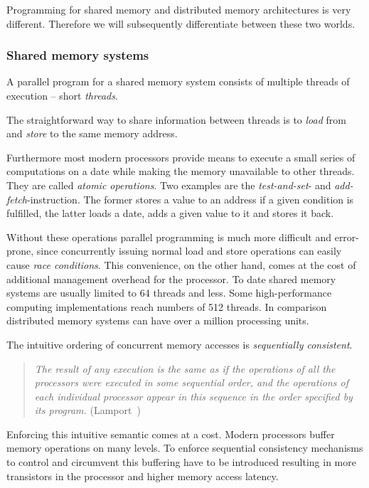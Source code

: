 \documentclass[a4paper, 10pt]{article}
\begin{document}
Programming for shared memory and distributed memory architectures is very different. Therefore we will subsequently differentiate between these two worlds.

\subsubsection{Shared memory systems}
\label{sssec:background-means-shared}
A parallel program for a shared memory system consists of multiple threads of execution -- short \emph{threads}.

The straightforward way to share information between threads is to \emph{load} from and \emph{store} to the same memory address.

Furthermore most modern processors provide means to execute a small series of computations on a date while making the memory unavailable to other threads. They are called \emph{atomic operations}. Two examples are the \emph{test-and-set}- and \emph{add-fetch}-instruction. The former stores a value to an address if a given condition is fulfilled, the latter loads a date, adds a given value to it and stores it back.

Without these operations parallel programming is much more difficult and error-prone, since concurrently issuing normal load and store operations can easily cause \emph{race conditions}. This convenience, on the other hand, comes at the cost of additional management overhead for the processor. To date shared memory systems are usually limited to 64 threads and less. Some high-performance computing implementations reach numbers of 512 threads. In comparison distributed memory systems can have over a million processing units.

The intuitive ordering of concurrent memory accesses is \emph{sequentially consistent}.
\begin{quote}
	\textit{The result of any execution is the same as if the operations of all the processors were executed in some sequential order, and the operations of each individual processor appear in this sequence in the order specified by its program.} (Lamport~\cite{sequentialconsistency})
\end{quote}

Enforcing this intuitive semantic comes at a cost. Modern processors buffer memory operations on many levels. To enforce sequential consistency mechanisms to control and circumvent this buffering have to be introduced resulting in more transistors in the processor and higher memory access latency.
\end{document}
